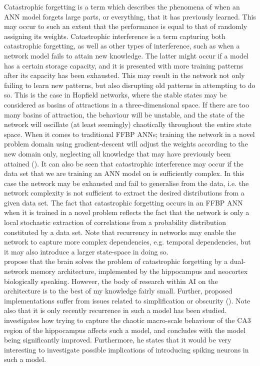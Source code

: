 Catastrophic forgetting \cite{McCloskey1989} is a term which describes the phenomena of when an ANN model forgets large parts, or everything, that it has previously learned. This may occur to such an extent that the performance is equal to that of randomly assigning its weights. Catastrophic interference is a term capturing both catastrophic forgetting, as well as other types of interference, such as when a network model fails to attain new knowledge. The latter might occur if a model has a certain storage capacity, and it is presented with more training patterns after its capacity has been exhausted. This may result in the network not only failing to learn new patterns, but also disrupting old patterns in attempting to do so. This is the case in Hopfield networks, where the stable states may be considered as basins of attractions in a three-dimensional space. If there are too many basins of attraction, the behaviour will be unstable, and the state of the network will oscillate (at least seemingly) chaotically throughout the entire state space.
When it comes to traditional FFBP ANNs; training the network in a novel problem domain using gradient-descent will adjust the weights according to the new domain only, neglecting all knowledge that may have previously been attained (\cite{McCloskey1989, French1999, French2001}).
It can also be seen that catastrophic interference may occur if the data set that we are training an ANN model on is sufficiently complex. In this case the network may be exhausted and fail to generalise from the data, i.e. the network complexity is not sufficient to extract the desired distributions from a given data set. 
The fact that catastrophic forgetting occurs in an FFBP ANN when it is trained in a novel problem reflects the fact that the network is only a local stochastic extraction of correlations from a probability distribution constituted by a data set. Note that recurrency in networks may enable the network to capture more complex dependencies, e.g. temporal dependencies, but it may also introduce a larger state-space in doing so.
\\

\cite{McClelland1995} propose that the brain solves the problem of catastrophic forgetting by a dual-network memory architecture, implemented by the hippocampus and neocortex biologically speaking. However, the body of research within AI on the architecture is to the best of my knowledge fairly small. Further, proposed implementations suffer from issues related to simplification or obscurity (\cite{French1997, French2001, Hattori2010, Hattori2014}). Note also that it is only recently recurrence in such a model has been studied. \cite{Hattori2014} investigates how trying to capture the chaotic macro-scale behaviour of the CA3 region of the hippocampus affects such a model, and concludes with the model being significantly improved. Furthermore, he states that it would be very interesting to investigate possible implications of introducing spiking neurons in such a model.
\\

